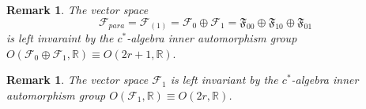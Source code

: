 \documentclass[aps, preprint]{revtex4}
\newtheorem{remark}[theorem]{Remark}
\begin{document}
\begin{remark}
The vector space
\begin{equation}\mathcal{F}_{p a r a} =\mathcal{F}_{\left (1\right )} =\mathcal{F}_{0} \oplus \mathcal{F}_{1} =\mathfrak{F}_{0 0} \oplus \mathfrak{F}_{1 0} \oplus \mathfrak{F}_{0 1}
\end{equation}is left invaraint by the $c^{ \ast }$-algebra inner automorphism group $O \left (\mathcal{F}_{0} \oplus \mathcal{F}_{1} ,\mathbb{R}\right ) \equiv O \left (2 r +1 ,\mathbb{R}\right )\text{.}$ 
\end{remark}


\begin{remark}
The vector space $\mathcal{F}_{1}$ is left invariant by the $c^{ \ast }$-algebra inner automorphism group $O \left (\mathcal{F}_{1} ,\mathbb{R}\right ) \equiv O \left (2 r ,\mathbb{R}\right )$. 
\end{remark}
\end{document}

